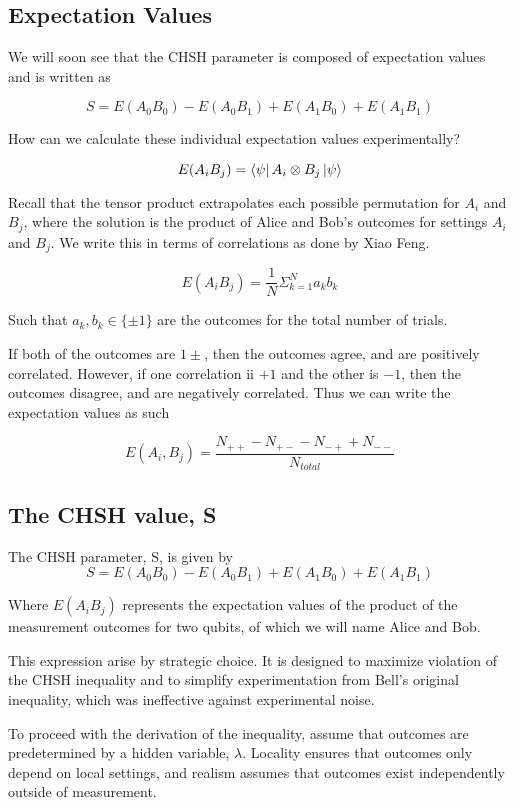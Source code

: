 \documentclass[12pt]{article}
\begin{document}
\subsection{Expectation Values}

We will soon see that the CHSH parameter is composed of expectation values and is written as

$$
S = E(A_0 B_0) - E(A_0 B_1) + E(A_1 B_0) + E(A_1 B_1)
$$

How can we calculate these individual expectation values experimentally?

$$
E(A_i B_j) = \bra{\psi} A_i \otimes B_j \ket{\psi}
$$

Recall that the tensor product extrapolates each possible permutation for $A_i$ and $B_j$, where the solution is the product of Alice and Bob's outcomes for settings $A_i$ and $B_j$. We write this in terms of correlations as done by Xiao Feng. \cite{CHSH_Derivation}

$$
E(A_i B_j) = \frac{1}{N} \Sigma_{k=1}^{N} a_k b_k
$$

Such that $a_k, b_k \in \{\pm1\}$ are the outcomes for the total number of trials. 

If both of the outcomes are $1\pm$, then the outcomes agree, and are positively correlated. However, if one correlation ii $+1$ and the other is $-1$, then  the outcomes disagree, and are negatively correlated. Thus we can write the expectation values as such

$$
E(A_i, B_j) = \frac{N_{++} - N_{+-} - N_{-+} + N_{--}}{N_{total}}
$$


\subsection{The CHSH value, S}


The CHSH parameter, S, is given by
$$
S = E(A_0 B_0) - E(A_0 B_1) + E(A_1 B_0) + E(A_1 B_1)
$$

Where $E(A_i B_j)$ represents the expectation values of the product of the measurement outcomes for two qubits, of which we will name Alice and Bob.

This expression arise by strategic choice. It is designed to maximize violation of the CHSH inequality and to simplify experimentation from Bell's original inequality, which was ineffective against experimental noise. \cite{CHSH1969}

To proceed with the derivation of the inequality, assume that outcomes are predetermined by a hidden variable, $\lambda$. Locality ensures that outcomes only depend on local settings, and realism assumes that outcomes exist independently outside of measurement.
\end{document}
